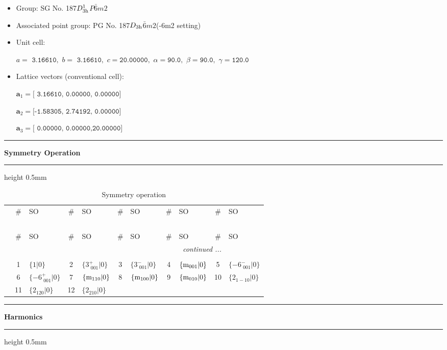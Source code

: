\documentclass[fleqn,10pt,landscape]{jsarticle}
\begin{document}
\begin{itemize}
\item Group: SG No. 187\quad$D_{\rm 3h}^{1}$\quad$P\bar{6}m2$\quad[ hexagonal ]
\item Associated point group: PG No. 187\quad$D_{\rm 3h}$\quad$\bar{6}m2$\quad(-6m2 setting)\quad[ hexagonal ]
\end{itemize}
\begin{itemize}
\item Unit cell:

\quad $a=\texttt{ 3.16610},\,\, b=\texttt{ 3.16610},\,\, c=\texttt{20.00000},\,\, \alpha=\texttt{90.0},\,\, \beta=\texttt{90.0},\,\, \gamma=\texttt{120.0}$

\item Lattice vectors (conventional cell):

\quad $\bm{a}_1=\texttt{[ 3.16610, 0.00000, 0.00000]}$

\quad $\bm{a}_2=\texttt{[-1.58305, 2.74192, 0.00000]}$

\quad $\bm{a}_3=\texttt{[ 0.00000, 0.00000,20.00000]}$

\end{itemize}
\vspace{5mm}
\noindent \rule[0.5mm]{5mm}{0.5mm}\hspace{3mm}\textbf{Symmetry Operation}\hspace{3mm}\leaders\hrule height 0.5mm\hfill\kern0pt
\vspace{3mm}

\renewcommand{\arraystretch}{1.6}
\begin{longtable}[l]{c|cl|cl|cl|cl|cl}
\captionsetup{justification=raggedright, singlelinecheck=off}
\caption{Symmetry operation}
 \\
 \hline \hline
 & \# & SO & \# & SO & \# & SO & \# & SO & \# & SO \\ \hline \endfirsthead

\multicolumn{10}{l}{\tablename\ \thetable{}} \\
 \hline \hline
 & \# & SO & \# & SO & \# & SO & \# & SO & \# & SO \\ \hline \endhead

 \hline \hline
\multicolumn{10}{r}{\footnotesize\it continued ...} \\ \endfoot

 \hline \hline
\multicolumn{10}{r}{} \\ \endlastfoot

 & 1 & $\{1|0\}$ & 2 & $\{3^{+}_{\,\,001}|0\}$ & 3 & $\{3^{-}_{\,\,001}|0\}$ & 4 & $\{{\rm m}_{001}|0\}$ & 5 & $\{-6^{-}_{\,\,001}|0\}$ \\
& 6 & $\{-6^{+}_{\,\,001}|0\}$ & 7 & $\{{\rm m}_{110}|0\}$ & 8 & $\{{\rm m}_{100}|0\}$ & 9 & $\{{\rm m}_{010}|0\}$ & 10 & $\{2{}_{1-10}|0\}$ \\
& 11 & $\{2{}_{120}|0\}$ & 12 & $\{2{}_{210}|0\}$ &  &  &  &  &  &  \\
\end{longtable}
\vspace{5mm}
\noindent \rule[0.5mm]{5mm}{0.5mm}\hspace{3mm}\textbf{Harmonics}\hspace{3mm}\leaders\hrule height 0.5mm\hfill\kern0pt
\vspace{3mm}
\end{document}
